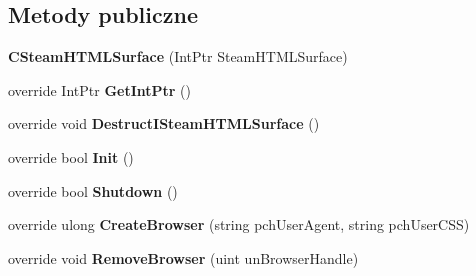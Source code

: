 \subsection*{Metody publiczne}
\begin{DoxyCompactItemize}
\item 
\mbox{\label{class_valve_1_1_steamworks_1_1_c_steam_h_t_m_l_surface_a6c52fbdf24d53d43fc446a68e87a95b7}} 
{\bfseries C\+Steam\+H\+T\+M\+L\+Surface} (Int\+Ptr Steam\+H\+T\+M\+L\+Surface)
\item 
\mbox{\label{class_valve_1_1_steamworks_1_1_c_steam_h_t_m_l_surface_a5cb63b7ee19c83c99a10310a644f3aed}} 
override Int\+Ptr {\bfseries Get\+Int\+Ptr} ()
\item 
\mbox{\label{class_valve_1_1_steamworks_1_1_c_steam_h_t_m_l_surface_ad86a49213ced2c8767cd711debf882ca}} 
override void {\bfseries Destruct\+I\+Steam\+H\+T\+M\+L\+Surface} ()
\item 
\mbox{\label{class_valve_1_1_steamworks_1_1_c_steam_h_t_m_l_surface_ad3d1ef49cfe00b83cc1bd00572d9171f}} 
override bool {\bfseries Init} ()
\item 
\mbox{\label{class_valve_1_1_steamworks_1_1_c_steam_h_t_m_l_surface_aef920fced8141d600901a396f980617f}} 
override bool {\bfseries Shutdown} ()
\item 
\mbox{\label{class_valve_1_1_steamworks_1_1_c_steam_h_t_m_l_surface_a69c9f2a1866e42786eeebc8e9381dd18}} 
override ulong {\bfseries Create\+Browser} (string pch\+User\+Agent, string pch\+User\+C\+SS)
\item 
\mbox{\label{class_valve_1_1_steamworks_1_1_c_steam_h_t_m_l_surface_a23c4716b5fbde708be4dfbb6f7d09d7f}} 
override void {\bfseries Remove\+Browser} (uint un\+Browser\+Handle)
\item 
\mbox{\label{class_valve_1_1_steamworks_1_1_c_steam_h_t_m_l_surface_a6070ac30784309897ba86736a08a58b7}} 

\end{DoxyCompactItemize}
